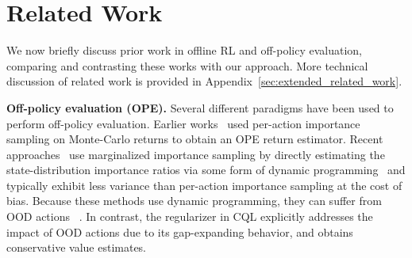 \vspace{-8pt}
\section{Related Work}
\label{sec:related}
\vspace{-8pt}
We now briefly discuss prior work in offline RL and off-policy evaluation, comparing and contrasting these works with our approach. More technical discussion of related work is provided in Appendix~\ref{sec:extended_related_work}.

\textbf{Off-policy evaluation (OPE).} Several different paradigms have been used to perform off-policy evaluation. Earlier works~\citep{precup2000eligibility,peshkin2002learning,precup2001off} used per-action importance sampling on Monte-Carlo returns to obtain an OPE return estimator. Recent approaches~\citep{liu2018breaking,gelada2019off,nachum2019dualdice,Zhang2020GenDICE:} use marginalized importance sampling by directly estimating the state-distribution importance ratios via some form of dynamic programming~\citep{levine2020offline} and typically exhibit less variance than per-action importance sampling at the cost of bias. Because these methods use dynamic programming, they can suffer from OOD actions
~\citep{levine2020offline,gelada2019off,hallak2017consistent,nachum2019dualdice}. In contrast, the regularizer in CQL explicitly addresses the impact of OOD actions due to its gap-expanding behavior, and obtains conservative value estimates.

